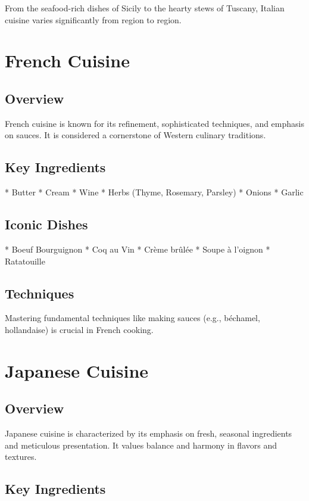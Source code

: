\documentclass{article}
\begin{document}
From the seafood-rich dishes of Sicily to the hearty stews of Tuscany, Italian cuisine varies significantly from region to region. 

\section{French Cuisine}

\subsection{Overview}

French cuisine is known for its refinement, sophisticated techniques, and emphasis on sauces. It is considered a cornerstone of Western culinary traditions.

\subsection{Key Ingredients}

*   Butter
*   Cream
*   Wine
*   Herbs (Thyme, Rosemary, Parsley)
*   Onions
*   Garlic

\subsection{Iconic Dishes}

*   Boeuf Bourguignon
*   Coq au Vin
*   Crème brûlée
*   Soupe à l'oignon
*   Ratatouille

\subsection{Techniques}

Mastering fundamental techniques like making sauces (e.g., béchamel, hollandaise) is crucial in French cooking.

\section{Japanese Cuisine}

\subsection{Overview}

Japanese cuisine is characterized by its emphasis on fresh, seasonal ingredients and meticulous presentation.  It values balance and harmony in flavors and textures.

\subsection{Key Ingredients}
\end{document}
